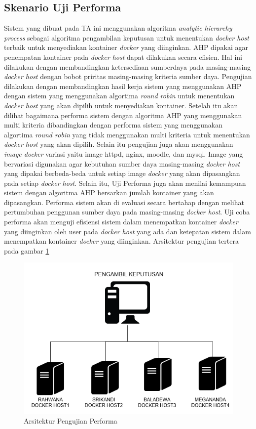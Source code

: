       \subsection{Skenario Uji Performa}
      Sistem yang dibuat pada TA ini menggunakan algoritma \textit{analytic hierarchy process} sebagai algoritma pengambilan keputusan untuk menentukan \textit{docker host} terbaik untuk menyediakan kontainer \textit{docker} yang diinginkan. AHP dipakai agar penempatan kontainer pada \textit{docker host} dapat dilakukan secara efisien. Hal ini dilakukan dengan membandingkan ketersediaan sumberdaya pada masing-masing \textit{docker host} dengan bobot priritas masing-masing kriteria sumber daya. Pengujian dilakukan dengan membandingkan hasil kerja sistem yang menggunakan AHP dengan sistem yang menggunakan algortima \textit{round robin} untuk menentukan \textit{docker host} yang akan dipilih untuk menyediakan kontainer. Setelah itu akan dilihat bagaimana performa sistem dengan algoritma AHP yang menggunakan multi kriteria dibandingkan dengan performa sistem yang menggunakan algortima \textit{round robin} yang tidak menggunakan multi kriteria untuk menentukan \textit{docker host} yang akan dipilih. Selain itu pengujian juga akan menggunakan \textit{image docker} variasi yaitu image httpd, nginx, moodle, dan mysql. Image yang bervariasi digunakan agar kebutuhan sumber daya masing-masing \textit{docker host} yang dipakai berbeda-beda untuk setiap image \textit{docker} yang akan dipasangkan pada setiap \textit{docker host}. 
      Selain itu, Uji Performa juga akan menilai kemampuan sistem dengan algoritma AHP bersarkan jumlah kontainer yang akan dipasangkan. Performa sistem akan di evaluasi secara bertahap dengan melihat pertumbuhan penggunan sumber daya pada masing-masing \textit{docker host}. Uji coba performa akan menguji efisiensi sistem dalam menempatkan kontainer \textit{docker} yang diinginkan oleh user pada \textit{docker host} yang ada dan ketepatan sistem dalam menempatkan kontainer \textit{docker} yang diinginkan.
      Arsitektur pengujian tertera pada gambar \ref{skenarioSkalabilitas}
\begin{figure}[H]
        \centering
        \includegraphics[width=\linewidth]{images/bab5/arsitekturujicoba}
        \caption{Arsitektur Pengujian Performa}
        \label{skenarioSkalabilitas}
      \end{figure} 
